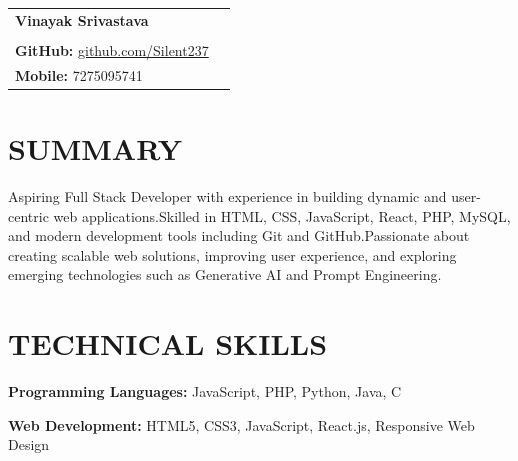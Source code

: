 \documentclass[a4paper,10.9pt]{article}
\begin{document}

\begin{tabularx}{\textwidth}{@{}X r@{}}
{\fontsize{22}{24}\selectfont\bfseries\color{hdrblue}Vinayak Srivastava} & \\[-1pt]
\vspace{1}

\begin{tabular}[t]{@{}l@{}}
{\small\textbf{LinkedIn:}
\href{https://www.linkedin.com/in/vinayak-srivastava-silent}
{linkedin.com/in/vinayak-srivastava-silent}}\\[-2pt]

{\small\textbf{GitHub:}
\href{https://github.com/Silent237}{github.com/Silent237}}
\end{tabular}

&

\begin{tabular}[t]{@{}r@{}}
{\small\textbf{Email:}
\href{mailto:vinayaksrivastava063@gmail.com}{vinayaksrivastava063@gmail.com}}\\[-2pt]

{\small\textbf{Mobile:} 7275095741}
\end{tabular}

\end{tabularx}

\vspace{-6pt}


\section*{SUMMARY}

Aspiring Full Stack Developer with experience in building dynamic and user-centric web applications.Skilled in HTML, CSS, JavaScript, React, PHP, MySQL, and modern development tools including Git and GitHub.Passionate about creating scalable web solutions, improving user experience, and exploring emerging technologies such as Generative AI and Prompt Engineering.


\section*{TECHNICAL SKILLS}

\textbf{Programming Languages:} JavaScript, PHP, Python, Java, C

\textbf{Web Development:} HTML5, CSS3, JavaScript, React.js, Responsive Web Design
\end{document}
